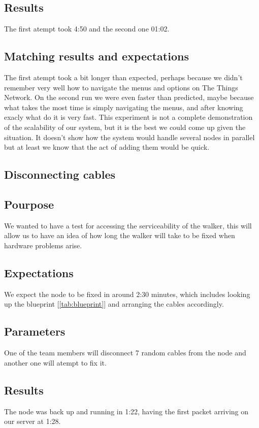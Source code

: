 	\subsection{Results}
		The first atempt took 4:50 and the second one 01:02.
	\subsection{Matching results and expectations}
		The first atempt took a bit longer than expected, perhaps because we didn't remember very well how to navigate the menus and options on The Things Network. On the second run we were even faster than predicted, maybe because what takes the most time is simply navigating the menus, and after knowing exacly what do it is very fast. This experiment is not a complete demonstration of the scalability of our system, but it is the best we could come up given the situation. It doesn't show how the system would handle several nodes in parallel but at least we know that the act of adding them would be quick.

\subsection{Disconnecting cables}

	\subsection{Pourpose}
		We wanted to have a test for accessing the serviceability of the walker, this will allow us to have an idea of how long the walker will take to be fixed when hardware problems arise.
	\subsection{Expectations}
		We expect the node to be fixed in around 2:30 minutes, which includes looking up the blueprint [\ref{tab:blueprint}] and arranging the cables accordingly.
	\subsection{Parameters}
		One of the team members will disconnect 7 random cables from the node and another one will atempt to fix it.
	\subsection{Results}
		The node was back up and running in 1:22, having the first packet arriving on our server at 1:28.
